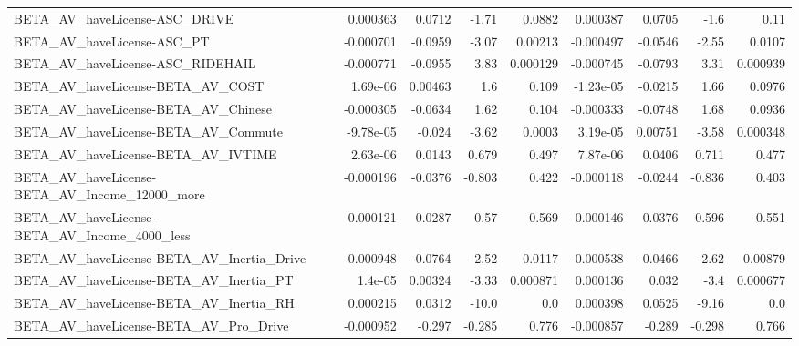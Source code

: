 \begin{tabular}{lrrrrrrrr}
BETA\_AV\_haveLicense-ASC\_DRIVE                      &    0.000363 &       0.0712 &    -1.71 &   0.0882 &   0.000387 &      0.0705 &         -1.6 &          0.11 \\
BETA\_AV\_haveLicense-ASC\_PT                         &   -0.000701 &      -0.0959 &    -3.07 &  0.00213 &  -0.000497 &     -0.0546 &        -2.55 &        0.0107 \\
BETA\_AV\_haveLicense-ASC\_RIDEHAIL                   &   -0.000771 &      -0.0955 &     3.83 & 0.000129 &  -0.000745 &     -0.0793 &         3.31 &      0.000939 \\
BETA\_AV\_haveLicense-BETA\_AV\_COST                   &    1.69e-06 &      0.00463 &      1.6 &    0.109 &  -1.23e-05 &     -0.0215 &         1.66 &        0.0976 \\
BETA\_AV\_haveLicense-BETA\_AV\_Chinese                &   -0.000305 &      -0.0634 &     1.62 &    0.104 &  -0.000333 &     -0.0748 &         1.68 &        0.0936 \\
BETA\_AV\_haveLicense-BETA\_AV\_Commute                &   -9.78e-05 &       -0.024 &    -3.62 &   0.0003 &   3.19e-05 &     0.00751 &        -3.58 &      0.000348 \\
BETA\_AV\_haveLicense-BETA\_AV\_IVTIME                 &    2.63e-06 &       0.0143 &    0.679 &    0.497 &   7.87e-06 &      0.0406 &        0.711 &         0.477 \\
BETA\_AV\_haveLicense-BETA\_AV\_Income\_12000\_more      &   -0.000196 &      -0.0376 &   -0.803 &    0.422 &  -0.000118 &     -0.0244 &       -0.836 &         0.403 \\
BETA\_AV\_haveLicense-BETA\_AV\_Income\_4000\_less       &    0.000121 &       0.0287 &     0.57 &    0.569 &   0.000146 &      0.0376 &        0.596 &         0.551 \\
BETA\_AV\_haveLicense-BETA\_AV\_Inertia\_Drive          &   -0.000948 &      -0.0764 &    -2.52 &   0.0117 &  -0.000538 &     -0.0466 &        -2.62 &       0.00879 \\
BETA\_AV\_haveLicense-BETA\_AV\_Inertia\_PT             &     1.4e-05 &      0.00324 &    -3.33 & 0.000871 &   0.000136 &       0.032 &         -3.4 &      0.000677 \\
BETA\_AV\_haveLicense-BETA\_AV\_Inertia\_RH             &    0.000215 &       0.0312 &    -10.0 &      0.0 &   0.000398 &      0.0525 &        -9.16 &           0.0 \\
BETA\_AV\_haveLicense-BETA\_AV\_Pro\_Drive              &   -0.000952 &       -0.297 &   -0.285 &    0.776 &  -0.000857 &      -0.289 &       -0.298 &         0.766 \\

\end{tabular}
